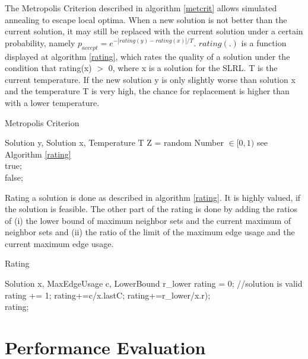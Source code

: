 \documentclass [12pt]{article}
\begin{document}
The Metropolis Criterion described in algorithm \ref{metcrit} allows simulated annealing to escape local optima. When a new solution is not better 
than the current solution, it may still be replaced with the current solution under a certain probability,
namely $p_{accept}=e^{-|rating(y)-rating(x)|/T}$. $rating(.)$ is a function displayed at algorithm \ref{rating}, which rates the quality of a solution under the condition
that rating(x) $>$ 0, where x is a solution for the SLRL. T is the current temperature. If the new solution y is only slightly worse than solution x and the temperature T is very high,
the chance for replacement is higher than with a lower temperature.

\begin {algorithm} [H]
\caption {Metropolis Criterion}
\label {metcrit}
\begin {algorithmic} [3]
\Require Solution y, Solution x, Temperature T
\State Z = random Number $\in [0,1)$
   \Comment see Algorithm \ref{rating}\\
  \Return true;
  \EndIf\\
  \Return false;
  \end {algorithmic}
  \end {algorithm}

  Rating a solution is done as described in algorithm \ref{rating}. It is highly valued, if the solution is
  feasible. The other part of the rating is done by adding the ratios of (i) the lower bound of maximum neighbor sets and the current maximum of neighbor sets and
  (ii) the ratio of the limit of the maximum edge usage and the current maximum edge usage.
  \begin {algorithm} [H]
  \caption {Rating}
  \label {rating}
  \begin {algorithmic} [3]
  \Require Solution x, MaxEdgeUsage c, LowerBound r\_lower
  \State rating = 0;
  \State //solution is valid
  rating += 1;
  \EndIf
  \State rating+=c/x.lastC;
  \State rating+=r\_lower/x.r);\\
  \Return rating;

  \end {algorithmic}
  \end {algorithm}

  \section{Performance Evaluation}
\end{document}
